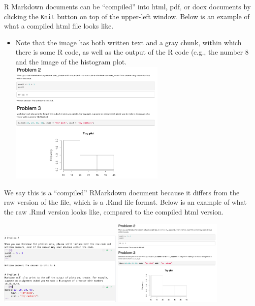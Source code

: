 \documentclass[
  letterpaper,
  DIV=11,
  numbers=noendperiod]{scrreprt}
\providecommand{\tightlist}{%
  \setlength{\itemsep}{0pt}\setlength{\parskip}{0pt}}\usepackage{longtable,booktabs,array}
\begin{document}
R Markdown documents can be ``compiled'' into html, pdf, or docx
documents by clicking the \texttt{Knit} button on top of the upper-left
window. Below is an example of what a compiled html file looks like.

\begin{itemize}
\tightlist
\item
  Note that the image has both written text and a gray chunk, within
  which there is some R code, as well as the output of the R code (e.g.,
  the number 8 and the image of the histogram plot.
  \includegraphics[width=0.6\textwidth,height=\textheight]{images/rmarkdownscreenshot.png}
\end{itemize}

We say this is a ``compiled'' RMarkdown document because it differs from
the raw version of the file, which is a .Rmd file format. Below is an
example of what the raw .Rmd version looks like, compared to the
compiled html version.

\includegraphics[width=0.45\textwidth,height=\textheight]{images/rmarkdownraw.png}
\includegraphics[width=0.4\textwidth,height=\textheight]{images/rmarkdownscreenshot.png}
\end{document}
